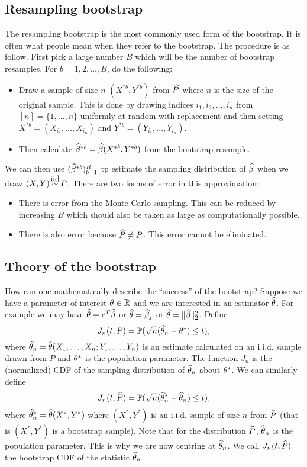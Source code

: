 \subsection{Resampling bootstrap}
The resampling bootstrap is the most commonly used form of the bootstrap. It is often what people mean when they refer to the bootstrap. The procedure is as follow. First pick a large number $B$ which will be the number of bootstrap resamples. For $b=1,2,\ldots, B$, do the following:
\begin{itemize}
    \item Draw a sample of size $n$ $(X^{*b},Y^{*b})$ from $\widehat{P}$ where $n$ is the size of the original sample. This is done by drawing indices $i_1,i_2,\ldots, i_n$ from $[n]=\{1,\ldots,n\}$ uniformly at random with replacement and then setting $X^{*b} =(X_{i_1}, \ldots , X_{i_n})$ and $Y^{*b} = (Y_{i_1},\ldots, Y_{i_n}).$
    \item  Then calculate $\widehat{\beta}^{*b} = \widehat{\beta}(X^{*b},Y^{*b})$ from the bootstrap resample.
\end{itemize}
We can then use $(\widehat{\beta}^{*b})_{b=1}^B$ tp estimate the sampling distribution of $\widehat{\beta}$ when we draw $(X,Y) \iid P$. There are two forms of error in this approximation:
\begin{itemize}
    \item There is error from the Monte-Carlo sampling. This can be reduced by increasing $B$ which should also be taken as large as computationally possible.
    \item There is also error because $\widehat{P}\neq P$. This error cannot be eliminated.
\end{itemize}
\subsection{Theory of the bootstrap} 
How can one mathematically describe the ``success'' of the bootstrap? Suppose we have a parameter of interest ${\theta} \in {\mathbb R}$ and we are interested in an estimator $\widehat{{\theta}}$. For example we may have $\widehat{{\theta}}=c^T\widehat{\beta}$ or $\widehat{{\theta}}=\widehat{\beta}_j$ or $\widehat{{\theta}}=\Vert \widehat{\beta}\Vert_2^2$. Define 
\[J_n(t,P) = {\mathbb{P}}(\sqrt{n}(\widehat{{\theta}}_n - {\theta}^*)\le t),\]
where $\widehat{{\theta}}_n = \widehat{{\theta}}(X_1,\ldots, X_n ; Y_1,\ldots, Y_n)$ is an estimate calculated on an i.i.d. sample drawn from $P$ and ${\theta}^*$ is the population parameter. The function $J_n$ is the (normalized) CDF of the sampling distribution of $\widehat{{\theta}}_n$ about ${\theta}^*$. We can similarly define 
\[J_n(t,\widehat{P}) = {\mathbb{P}}(\sqrt{n}(\widehat{{\theta}}^*_n - \widehat{{\theta}}_n)\le t),\]
where $\widehat{{\theta}}_n^* = \widehat{{\theta}}(X^*,Y^*)$ where $(X^*,Y^*)$ is an i.i.d. sample of size $n$ from $\widehat{P}$ (that is $(X^*,Y^*)$ is a bootstrap sample). Note that for the distribution $\widehat{P}$, $\widehat{{\theta}}_n$ is the population parameter. This is why we are now centring at $\widehat{{\theta}}_n$. We call $J_n(t,\widehat{P})$ the bootstrap CDF of the statistic $\widehat{{\theta}}_n$. 

